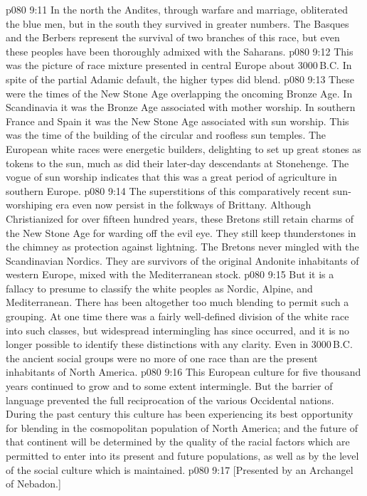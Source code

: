 \vs p080 9:11 In the north the Andites, through warfare and marriage, obliterated the blue men, but in the south they survived in greater numbers. The Basques and the Berbers represent the survival of two branches of this race, but even these peoples have been thoroughly admixed with the Saharans.
\vs p080 9:12 \pc This was the picture of race mixture presented in central Europe about 3000\,B.C. In spite of the partial Adamic default, the higher types did blend.
\vs p080 9:13 \pc These were the times of the New Stone Age overlapping the oncoming Bronze Age. In Scandinavia it was the Bronze Age associated with mother worship. In southern France and Spain it was the New Stone Age associated with sun worship. This was the time of the building of the circular and roofless sun temples. The European white races were energetic builders, delighting to set up great stones as tokens to the sun, much as did their later\hyp{}day descendants at Stonehenge. The vogue of sun worship indicates that this was a great period of agriculture in southern Europe.
\vs p080 9:14 The superstitions of this comparatively recent sun\hyp{}worshiping era even now persist in the folkways of Brittany. Although Christianized for over fifteen hundred years, these Bretons still retain charms of the New Stone Age for warding off the evil eye. They still keep thunderstones in the chimney as protection against lightning. The Bretons never mingled with the Scandinavian Nordics. They are survivors of the original Andonite inhabitants of western Europe, mixed with the Mediterranean stock.
\vs p080 9:15 \pc But it is a fallacy to presume to classify the white peoples as Nordic, Alpine, and Mediterranean. There has been altogether too much blending to permit such a grouping. At one time there was a fairly well\hyp{}defined division of the white race into such classes, but widespread intermingling has since occurred, and it is no longer possible to identify these distinctions with any clarity. Even in 3000\,B.C. the ancient social groups were no more of one race than are the present inhabitants of North America.
\vs p080 9:16 This European culture for five thousand years continued to grow and to some extent intermingle. But the barrier of language prevented the full reciprocation of the various Occidental nations. During the past century this culture has been experiencing its best opportunity for blending in the cosmopolitan population of North America; and the future of that continent will be determined by the quality of the racial factors which are permitted to enter into its present and future populations, as well as by the level of the social culture which is maintained.
\vsetoff
\vs p080 9:17 [Presented by an Archangel of Nebadon.]
